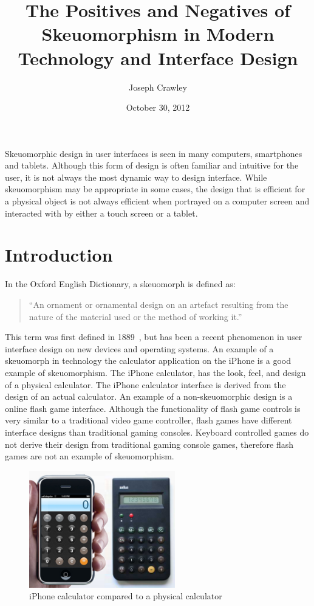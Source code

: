 \documentclass{article}
\title{The Positives and Negatives of Skeuomorphism in Modern Technology and Interface Design}
\author{Joseph Crawley}
\date{October 30, 2012}
\begin{document}
\maketitle

\abstract{}
Skeuomorphic design in user interfaces is seen in many computers, smartphones and tablets. Although this form of design is often familiar and intuitive for the user, it is not always the most dynamic way to design interface. While skeuomorphism may be appropriate in some cases, the design that is efficient for a physical object is not always efficient when portrayed on a computer screen and interacted with by either a touch screen or a tablet. 


\pagebreak
\tableofcontents


\listoffigures


\listoftables

\pagebreak

%
%
\section{Introduction}
\label{introduction}

In the Oxford English Dictionary, a skeuomorph is defined as: 
\begin{quote}“An ornament or ornamental design on an artefact resulting from the nature of the material used or the method of working it.” 
\end {quote}This term was first defined in 1889~\cite{oed}, but has been a recent phenomenon in user interface design on new devices and operating systems. An example of a skeuomorph in technology the calculator application on the iPhone is a good example of skeuomorphism. The iPhone calculator, has the look, feel, and design of a physical calculator. The iPhone calculator interface is derived from the design of an actual calculator. An example of a non-skeuomorphic design is a online flash game interface. Although the functionality of flash game controls is very similar to a traditional video game controller, flash games have different interface designs than traditional gaming consoles. Keyboard controlled games do not derive their design from traditional gaming console games, therefore flash games are not an example of skeuomorphism.
\begin{figure}
\centering
\includegraphics[width=2.5in]{calculator.jpeg} 

\caption{iPhone calculator compared to a physical calculator}
\label{calc}
\end{figure}
\end{document}
